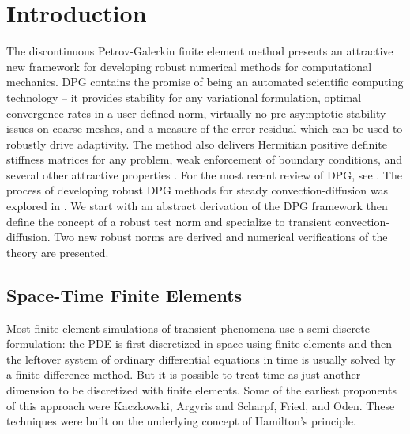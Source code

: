 \documentclass{article}
\theoremstyle{definition}
\theoremstyle{remark}
\begin{document}
\section{Introduction}
The discontinuous Petrov-Galerkin finite element method presents an attractive new framework 
for developing robust numerical methods for computational mechanics.
DPG contains the promise of being an automated scientific computing technology -- it provides stability for any variational formulation, 
optimal convergence rates in a user-defined norm, virtually no pre-asymptotic stability issues on coarse meshes, 
and a measure of the error residual which can be used to robustly drive adaptivity.
The method also delivers Hermitian positive definite stiffness matrices for any problem, 
weak enforcement of boundary conditions, and several other attractive properties \cite{DPG2,DPGOverview,DPGMixed}.
For the most recent review of DPG, see \cite{DPGEncyclopedia}.
The process of developing robust DPG methods for steady convection-diffusion was explored in \cite{DemkowiczHeuer,ChanHeuerThanhDemkowicz2012}.
We start with an abstract derivation of the DPG framework then define the concept of a robust test norm
and specialize to transient convection-diffusion.
Two new robust norms are derived and numerical verifications of the theory are presented.


\subsection{Space-Time Finite Elements}
Most finite element simulations of transient phenomena use a semi-discrete formulation:
the PDE is first discretized in space using finite elements and then the leftover system of ordinary differential equations in time
is usually solved by a finite difference method.
But it is possible to treat time as just another dimension to be discretized with finite elements.
Some of the earliest proponents of this approach were Kaczkowski\cite{Kaczkowski1975}, 
Argyris and Scharpf\cite{ArgyrisSpaceTime}, Fried\cite{FriedSpaceTime}, and Oden\cite{OdenSpaceTime}.
These techniques were built on the underlying concept of Hamilton's principle.
\end{document}
